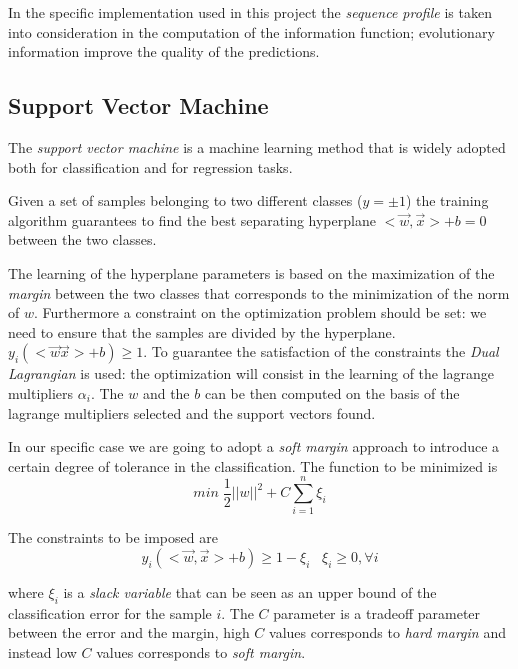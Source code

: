 \documentclass[a4paper,twocolumn]{article}
\begin{document}
In the specific implementation used in this project the \emph{sequence profile} is
taken into consideration in the computation of the information function;
evolutionary information improve the quality of the predictions.


\subsection{Support Vector Machine}
\label{sec:orga8d8d54}
The \emph{support vector machine} is a machine learning method that is widely adopted
both for classification and for regression tasks.

Given a set of samples belonging to two different classes (\(y=\pm 1\)) the
training algorithm guarantees to find the best separating hyperplane \(<\vec{w}, \vec{x}> + b =0\) between the two classes.

The learning of the hyperplane parameters is based on the maximization of the
\emph{margin} between the two classes that corresponds to the minimization of the
norm of \(w\). Furthermore a constraint on the optimization problem should be set:
we need to ensure that the samples are divided by the hyperplane.
\(y_{i}(<\vec{w}\vec{x}> + b) \geq 1\). To guarantee the satisfaction of the
constraints the \emph{Dual Lagrangian} is used: the optimization will consist in the
learning of the lagrange multipliers \(\alpha_{i}\). The \(w\) and the \(b\) can be then computed
on the basis of the lagrange multipliers selected and the support vectors found.

In our specific case we are going to adopt a \emph{soft margin} approach to introduce
a certain degree of tolerance in the classification.
The function to be minimized is
\begin{equation} min \; \frac{1}{2} ||w||^{2} + C \sum_{i=1}^{n} \xi_{i}\end{equation}

The constraints to be imposed are
\begin{equation} y_{i}(<\vec{w}, \vec{x}> + b) \geq 1- \xi_{i} \;\;\; \xi_{i}\geq 0 , \forall i  \end{equation}

where \(\xi_{i}\) is a \emph{slack variable} that can be seen as an upper bound of the
classification error for the sample \(i\). The \(C\) parameter is a tradeoff
parameter between the error and the margin, high \(C\) values corresponds to \emph{hard
margin} and instead low \(C\) values corresponds to \emph{soft margin}.
\end{document}
